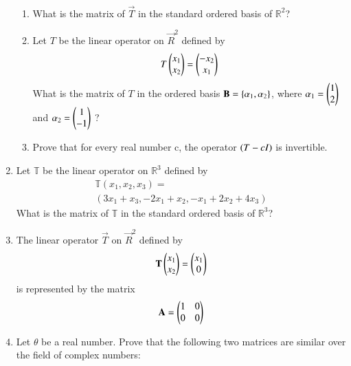 \begin{enumerate}[label=\thesubsection.\arabic*.,ref=\thesubsection.\theenumi]
\begin{align}
\end{align}
\begin{enumerate}
\item What is the matrix of $\vec{T}$ in the standard ordered basis of $\mathbb{R}^2$?
%
\\
\solution

\item  	Let $T$ be the linear operator on $\vec{R}^2$ defined by 
	\begin{align}
		T\begin{pmatrix}x_1\\ x_2\end{pmatrix} = \begin{pmatrix}-x_2\\ x_1\end{pmatrix} 
	\end{align}
	What is the matrix of $T$ in the ordered basis $\mathbf{B} = \left\{ \mathbf{ \alpha }_1, \mathbf{\alpha}_2\right\}$, where $\mathbf{\alpha}_1 = \begin{pmatrix}1\\ 2\end{pmatrix}$ and $\mathbf{\alpha}_2 = \begin{pmatrix}1 \\ -1\end{pmatrix}$ ?
%
\\
\solution

\item Prove that for every real number c, the operator $\left(T-cI\right)$ is invertible.
%
\\
\solution

\end{enumerate}
\item Let $\mathbb{T}$ be the linear operator on $\mathbb{R}^3$ defined by 
\begin{align}
    \mathbb{T}(x_1,x_2,x_3)=\\(3x_1+x_3,-2x_1+x_2,-x_1+2x_2+4x_3)\label{eq:solutions/3/4/7/a/1}
\end{align}
What is the matrix of $\mathbb{T}$ in the standard ordered basis of $\mathbb{R}^3$?
%
\\
\solution

\item The linear operator $\vec{T}$ on $\vec{R}^2$ defined by 
\begin{align}
	\mathbf{T}\begin{pmatrix}x_1\\x_2\end{pmatrix}=\begin{pmatrix}x_1\\0\end{pmatrix}
\end{align}
is represented by the matrix
\begin{align}
	\mathbf{A}=\begin{pmatrix}1&0\\
		       0&0\end{pmatrix}
\end{align}
\item Let $\theta$ be a real number. Prove that the following two matrices are similar over the field of complex numbers: 
\begin{align}

\end{align}
\end{enumerate}
